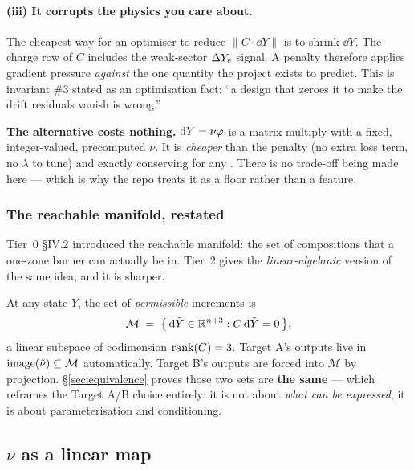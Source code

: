 \paragraph{(iii) It corrupts the physics you care about.} The cheapest way for
an optimiser to reduce $\|C\cdot \dd Y\|$ is to shrink $\dd Y$. The charge row
of $C$ includes the weak-sector $\Delta Y_{e}$ signal. A penalty therefore applies
gradient pressure \emph{against} the one quantity the project exists to predict.
This is  invariant \#3 stated as an optimisation fact: ``a
design that zeroes it to make the drift residuals vanish is wrong.''

\begin{invariant}
\textbf{The alternative costs nothing.} $\mathrm{d} Y = \nu\varphi$ is a matrix
multiply with a fixed, integer-valued, precomputed $\nu$. It is \emph{cheaper}
than the penalty (no extra loss term, no $\lambda$ to tune) and exactly
conserving for any \netflux. There is no trade-off being made here --- which is
why the repo treats it as a floor rather than a feature.
\end{invariant}

\subsubsection{The reachable manifold, restated}
\label{sec:reachable}

Tier~0 \S IV.2 introduced the reachable manifold: the set of compositions that a
one-zone burner can actually be in. Tier~2 gives the \emph{linear-algebraic}
version of the same idea, and it is sharper.

At any state $Y$, the set of \emph{permissible} increments is
%
\begin{equation}
\mathcal{M} \;=\; \bigl\{\,\mathrm{d}\tilde Y \in \mathbb{R}^{n+3} :
                   C\,\mathrm{d}\tilde Y = 0\,\bigr\},
\label{eq:manifold}
\end{equation}
%
a linear subspace of codimension $\operatorname{rank}(C) = 3$. Target A's outputs live in
$\operatorname{image}(\tilde\nu) \subseteq \mathcal{M}$ automatically. Target B's outputs are
forced into $\mathcal{M}$ by projection. \S\ref{sec:equivalence} proves those
two sets are \textbf{the same} --- which reframes the Target A/B choice
entirely: it is not about \emph{what can be expressed}, it is about
parameterisation and conditioning.

\subsection{\texorpdfstring{$\nu$}{nu} as a linear map}
\label{sec:numap}

